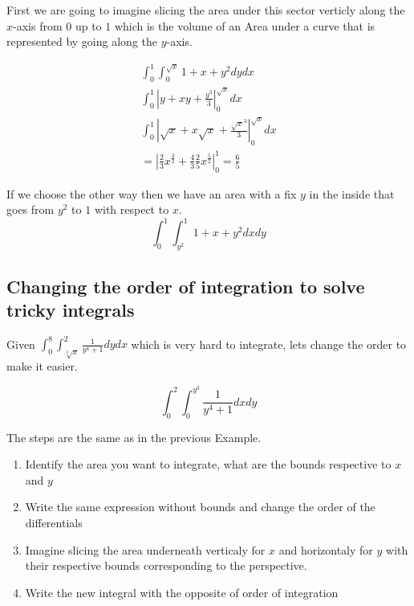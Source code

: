 First we are going to imagine slicing the area under this sector verticly along the \(x\)-axis from \(0\) up to \(1\) which
is the volume of an Area under a curve that is represented by going along the \(y\)-axis.

\begin{align*}
    \int_{0}^{1}\int_{0}^{\sqrt{x}} 1 + x + y^2 dydx \\
    \int_{0}^{1} \left| y + xy + \frac{y^3}{3} \right|_{0}^{\sqrt{x}} dx \\
    \int_{0}^{1} \left| \sqrt{x} + x\sqrt{x} + \frac{\sqrt{x}^3}{3} \right|_{0}^{\sqrt{x}} dx \\
    = \left| \frac{2}{3} x^{\frac{3}{2}} + \frac{4}{3} \frac{2}{5} x^{\frac{5}{2}} \right|_{0}^{1} = \frac{6}{5}
\end{align*}

If we choose the other way then we have an area with a fix \(y\) in the inside that goes from \(y^2\) to \(1\) with respect to \(x\).
\[
\int_{0}^{1}\int_{y^2}^{1} 1 + x + y^2 dxdy
\]

\subsection{Changing the order of integration to solve tricky integrals}

Given \(\int_{0}^{8}\int_{\sqrt[3]{x}}^{2} \frac{1}{y^4 +1}dydx\) which is very hard to integrate, lets change the order
to make it easier.

\[\int_{0}^{2}\int_{0}^{y^3} \frac{1}{y^4 +1}dxdy\]

The steps are the same as in the previous Example.

\begin{enumerate}
    \item Identify the area you want to integrate, what are the bounds respective to \(x\) and \(y\)
    \item Write the same expression without bounds and change the order of the differentials
    \item Imagine slicing the area underneath verticaly for \(x\) and horizontaly for \(y\) with their respective bounds corresponding
    to the perspective.
    \item Write the new integral with the opposite of order of integration
\end{enumerate}

